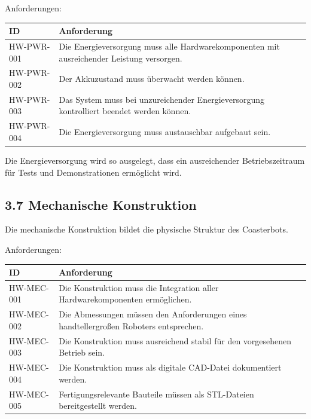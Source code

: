 \documentclass[
  a4paper,
  12pt,
  DIV=12,        %
  parskip=half,  %
  headings=small %
]{scrartcl}
\theoremstyle{definition}
\theoremstyle{definition}
\begin{document}
Anforderungen:

\begin{longtable}[]{@{}
  >{\raggedright\arraybackslash}p{}
  >{\raggedright\arraybackslash}p{}@{}}
\toprule\noalign{}
\begin{minipage}[b]{\linewidth}\raggedright
ID
\end{minipage} & \begin{minipage}[b]{\linewidth}\raggedright
Anforderung
\end{minipage} \\
\midrule\noalign{}
\endhead
\bottomrule\noalign{}
\endlastfoot
HW-PWR-001 & Die Energieversorgung muss alle Hardwarekomponenten mit
ausreichender Leistung versorgen. \\
HW-PWR-002 & Der Akkuzustand muss überwacht werden können. \\
HW-PWR-003 & Das System muss bei unzureichender Energieversorgung
kontrolliert beendet werden können. \\
HW-PWR-004 & Die Energieversorgung muss austauschbar aufgebaut sein. \\
\end{longtable}

Die Energieversorgung wird so ausgelegt, dass ein ausreichender
Betriebszeitraum für Tests und Demonstrationen ermöglicht wird.

\subsection{3.7 Mechanische
Konstruktion}\label{mechanische-konstruktion}

Die mechanische Konstruktion bildet die physische Struktur des
Coasterbots.

Anforderungen:

\begin{longtable}[]{@{}
  >{\raggedright\arraybackslash}p{}
  >{\raggedright\arraybackslash}p{}@{}}
\toprule\noalign{}
\begin{minipage}[b]{\linewidth}\raggedright
ID
\end{minipage} & \begin{minipage}[b]{\linewidth}\raggedright
Anforderung
\end{minipage} \\
\midrule\noalign{}
\endhead
\bottomrule\noalign{}
\endlastfoot
HW-MEC-001 & Die Konstruktion muss die Integration aller
Hardwarekomponenten ermöglichen. \\
HW-MEC-002 & Die Abmessungen müssen den Anforderungen eines
handtellergroßen Roboters entsprechen. \\
HW-MEC-003 & Die Konstruktion muss ausreichend stabil für den
vorgesehenen Betrieb sein. \\
HW-MEC-004 & Die Konstruktion muss als digitale CAD-Datei dokumentiert
werden. \\
HW-MEC-005 & Fertigungsrelevante Bauteile müssen als STL-Dateien
bereitgestellt werden. \\
\end{longtable}
\end{document}
